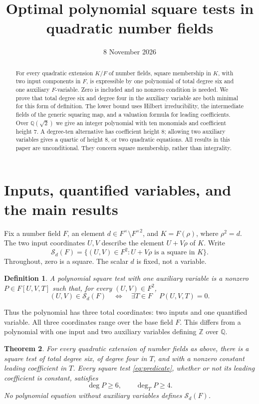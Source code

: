 \documentclass[11pt,a4paper]{article}
\title{Optimal polynomial square tests in quadratic number fields}
\author{}\date{8 November 2026}
\newtheorem{theorem}{Theorem}[section]
\newtheorem{definition}[theorem]{Definition}
\newcommand{\Q}{\mathbb Q}\newcommand{\Z}{\mathbb Z}
\begin{document}
\maketitle
\begin{abstract}
For every quadratic extension $K/F$ of number fields, square membership
in $K$, with two input components in $F$, is expressible by one polynomial
of total degree six and one auxiliary $F$-variable. Zero is included and
no nonzero condition is needed. We prove that total degree six and degree
four in the auxiliary variable are both minimal for this form of
definition. The lower bound uses Hilbert irreducibility, the intermediate
fields of the generic squaring map, and a valuation formula for leading
coefficients. Over $\Q(\sqrt2)$ we give an integer polynomial with ten
monomials and coefficient height $7$. A degree-ten alternative has
coefficient height $8$; allowing two auxiliary variables gives a quartic
of height $8$, or two quadratic equations. All results in this paper are
unconditional. They concern square membership, rather than integrality.
\end{abstract}

\section{Inputs, quantified variables, and the main results}

Fix a number field $F$, an element $d\in F^\times\setminus F^{\times2}$,
and $K=F(\rho)$, where $\rho^2=d$. The two input coordinates $U,V$
describe the element $U+V\rho$ of $K$. Write
\[
 \mathcal S_d(F)=\{(U,V)\in F^2:U+V\rho\text{ is a square in }K\}.
\]
Throughout, zero is a square. The scalar $d$ is fixed, not a variable.

\begin{definition}
A polynomial square test with one auxiliary variable is a nonzero
$P\in F[U,V,T]$ such that, for every $(U,V)\in F^2$,
\begin{equation}\label{eq:predicate}
 (U,V)\in\mathcal S_d(F)
 \quad\Longleftrightarrow\quad
 \exists T\in F\quad P(U,V,T)=0.
\end{equation}
\end{definition}

Thus the polynomial has three total coordinates: two inputs and one
quantified variable. All three coordinates range over the base field
$F$. This differs from a polynomial with one input and two auxiliary
variables defining $\Z$ over $\Q$.

\begin{theorem}\label{thm:main}
For every quadratic extension of number fields as above, there is a
square test of total degree six, of degree four in $T$, and with a
nonzero constant leading coefficient in $T$. Every square test
\eqref{eq:predicate}, whether or not its leading coefficient is constant,
satisfies
\[
                         \deg P\ge6,\qquad \deg_TP\ge4.
\]
No polynomial equation without auxiliary variables defines
$\mathcal S_d(F)$.
\end{theorem}
\end{document}
